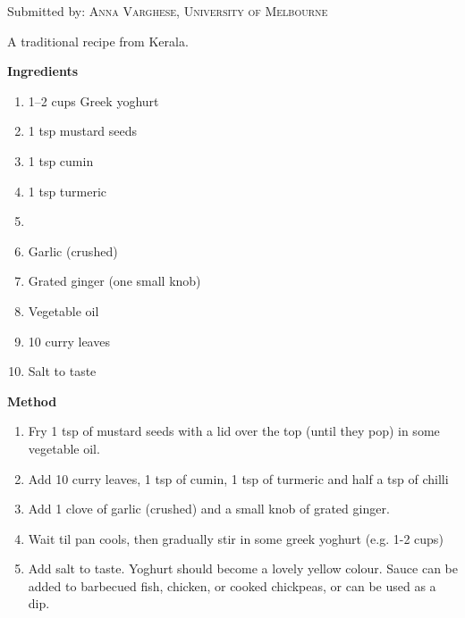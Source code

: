 

Submitted by: \textsc{Anna Varghese, University of Melbourne}


\begin{shadequote*}
A traditional recipe from Kerala.
\end{shadequote*}
\hrulefill

\textbf{Ingredients}

\begin{enumerate}[before=\itshape,font=\normalfont]
\item 1--2 cups Greek yoghurt
\item 1 tsp mustard seeds
\item 1 tsp cumin
\item 1 tsp turmeric
\item \textonehalf
\item Garlic (crushed)
\item Grated ginger (one small knob)
\item Vegetable oil
\item 10 curry leaves
\item Salt to taste
\end{enumerate}

\hrulefill

\textbf{Method}

\begin{enumerate}
\item Fry 1 tsp of mustard seeds with a lid over the top  (until they pop) in some vegetable oil. 
\item Add 10 curry leaves, 1 tsp of cumin, 1 tsp of turmeric and half a tsp of chilli 
\item Add 1 clove of garlic (crushed) and a small knob of grated ginger. 
\item Wait til pan cools, then gradually stir in some greek yoghurt (e.g. 1-2 cups)
\item Add salt to taste. Yoghurt should become a lovely yellow colour. Sauce can be added to barbecued fish, chicken, or cooked chickpeas, or can be used as a dip.
\end{enumerate}



\vfill
\pagebreak